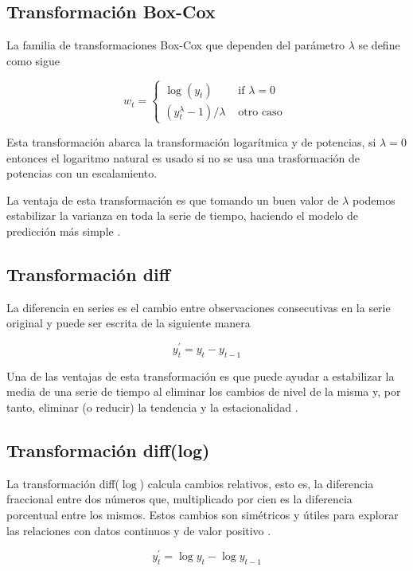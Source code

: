 \subsection{Transformación Box-Cox}
La familia de transformaciones Box-Cox que dependen del parámetro $\lambda$ se define como sigue

\[
w_{t}= \begin{cases}\log \left(y_{t}\right) & \text { if } \lambda=0 \\ \left(y_{t}^{\lambda}-1\right) / \lambda & \text { otro caso }\end{cases}
\]

Esta transformación abarca la transformación logarítmica y de potencias, si $\lambda = 0$ entonces el logaritmo natural es usado si no se usa una trasformación de potencias con un escalamiento.

La ventaja de esta transformación es que tomando un buen valor de $\lambda$ podemos estabilizar la varianza en toda la serie de tiempo, haciendo el modelo de predicción más simple \parencite{hyndmanForecastingPrinciplesPractice2018}. 

\subsection{Transformación diff}

La diferencia en series es el cambio entre observaciones consecutivas en la serie original y puede ser escrita de la siguiente manera

\[
y_{t}^{\prime}=y_{t}-y_{t-1}
\]

Una de las ventajas de esta transformación es que puede ayudar a estabilizar la media de una serie de tiempo al eliminar los cambios de nivel de la misma y, por tanto, eliminar (o reducir) la tendencia y la estacionalidad \parencite{hyndmanForecastingPrinciplesPractice2018}.

\subsection{Transformación diff(log)}

La transformación diff($\log$) calcula cambios relativos, esto es, la diferencia fraccional entre dos números que, multiplicado por cien es la diferencia porcentual entre los mismos. Estos cambios son simétricos y útiles para explorar las relaciones con datos continuos y de valor positivo \parencite{coleStatisticsNotesPercentage2017}.

\[
y_{t}^{\prime}=\log{y_{t}}-\log{y_{t-1}}
\]

